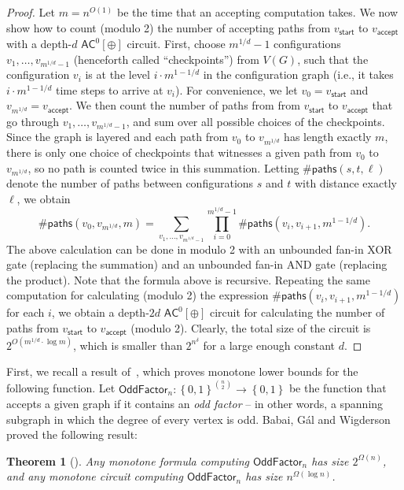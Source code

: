 \documentclass[10pt,a4paper]{article}
\newtheorem{theorem}{Theorem}[section]
\newcommand{\complexityfont}[1]{\mathsf{#1}}
\def\AC           {\complexityfont{AC}}
\newcommand{\set}[1]{\left\{#1\right\}}
\newcommand{\blt}{\set{0,1}}
\newcommand{\OddFactor}{\mathsf{OddFactor}}
\begin{document}
\begin{proof}
    Let $m = n^{O(1)}$ be the time that an accepting computation takes.
    We now show
    how to count (modulo 2)
    the number of accepting paths from
    $v_{\mathsf{start}}$
    to
    $v_{\mathsf{accept}}$ with a depth-$d$ $\AC^0[\oplus]$ circuit.
    First, choose
    $m^{1/d}-1$ configurations $v_1,\dots,v_{m^{1/d}-1}$
    (henceforth called ``checkpoints'')
    from $V(G)$, such that the configuration
    $v_i$ is at the level
    $i \cdot m^{1-1/d}$ in the configuration graph
    (i.e., it takes $i \cdot m^{1-1/d}$ time steps to arrive at $v_i$).
    For convenience, we let $v_0 = v_{\mathsf{start}}$
    and $v_{m^{1/d}} = v_{\mathsf{accept}}$.
    We then count the number of paths from 
    from $v_{\mathsf{start}}$
    to $v_{\mathsf{accept}}$
    that go through $v_1,\dots,v_{m^{1/d}-1}$,
    and sum over all possible choices of the checkpoints.
    Since the graph is layered and
    each path from $v_0$ to $v_{m^{1/d}}$ has length exactly $m$,
    there is only one choice of checkpoints that witnesses
    a given path from $v_0$ to $v_{m^{1/d}}$,
    so no path is counted twice in this summation.
    Letting
    $\#\mathsf{paths}(s,t,\ell)$ denote the number of paths between
    configurations $s$ and $t$ with distance exactly $\ell$,
    we obtain
    \begin{equation*}
        \#\mathsf{paths}(v_{0},v_{m^{1/d}}, m)
        =
        \sum_{v_1,\dots,v_{m^{1/d}-1}}
        \prod_{i=0}^{m^{1/d}-1}
        \#\mathsf{paths}(v_i,v_{i+1}, m^{1-1/d}).
    \end{equation*}
    The above calculation can be done in modulo 2 with an unbounded fan-in XOR gate
    (replacing the summation)
    and an unbounded fan-in AND gate
    (replacing the product).
    Note that the formula above is recursive.
    Repeating the same computation for calculating (modulo 2)
    the expression
    $\#\mathsf{paths}(v_i,v_{i+1}, m^{1-1/d})$ for each $i$,
    we obtain a depth-$2d$ $\AC^0[\oplus]$ circuit
    for calculating the number of paths from $v_{\mathsf{start}}$ to
    $v_{\mathsf{accept}}$ (modulo 2).
    Clearly, the total size of the circuit is
    $2^{O(m^{1/d} \cdot \log m)}$,
    which is smaller than $2^{n^\delta}$ for a large enough constant $d$.
\end{proof}

First, we recall a result
of~\cite{DBLP:journals/combinatorica/BabaiGW99},
which proves monotone lower bounds for the following function.
Let 
$\OddFactor_n : \blt^{\binom{n}{2}} \to \blt$
be the function that accepts a given 
graph
if 
it
contains an \emph{odd factor} -- in other words,
a spanning subgraph in which the degree of every vertex is odd.
Babai, Gál and Wigderson~\cite{DBLP:journals/combinatorica/BabaiGW99}
proved
the following result:
\begin{theorem}[\cite{DBLP:journals/combinatorica/BabaiGW99}]
    \label{thm:bip-oddfactor-lb}
        Any monotone formula computing 
        $\OddFactor_n$ 
        has size $2^{\Omega(n)}$,
        and any monotone circuit computing
        $\OddFactor_n$ 
        has size $n^{\Omega(\log n)}$.
\end{theorem}
\end{document}
